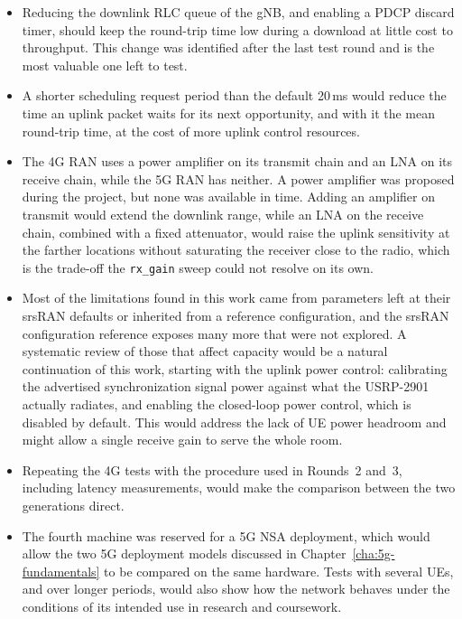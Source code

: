 \begin{itemize}
    \item Reducing the downlink \gls{RLC} queue of the \gls{gNB}, and enabling a \gls{PDCP} discard timer, should keep the round-trip time low during a download at little cost to throughput. This change was identified after the last test round and is the most valuable one left to test.

    \item A shorter scheduling request period than the default 20\,ms would reduce the time an uplink packet waits for its next opportunity, and with it the mean round-trip time, at the cost of more uplink control resources.

    \item The 4G \gls{RAN} uses a power amplifier on its transmit chain and an \gls{LNA} on its receive chain, while the 5G \gls{RAN} has neither. A power amplifier was proposed during the project, but none was available in time. Adding an amplifier on transmit would extend the downlink range, while an \gls{LNA} on the receive chain, combined with a fixed attenuator, would raise the uplink sensitivity at the farther locations without saturating the receiver close to the radio, which is the trade-off the \texttt{rx\_gain} sweep could not resolve on its own.

    \item Most of the limitations found in this work came from parameters left at their srsRAN defaults or inherited from a reference configuration, and the srsRAN configuration reference exposes many more that were not explored. A systematic review of those that affect capacity would be a natural continuation of this work, starting with the uplink power control: calibrating the advertised synchronization signal power against what the USRP-2901 actually radiates, and enabling the closed-loop power control, which is disabled by default. This would address the lack of \gls{UE} power headroom and might allow a single receive gain to serve the whole room.

    \item Repeating the 4G tests with the procedure used in Rounds~2 and~3, including latency measurements, would make the comparison between the two generations direct.

    \item The fourth machine was reserved for a 5G \gls{NSA} deployment, which would allow the two 5G deployment models discussed in Chapter~\ref{cha:5g-fundamentals} to be compared on the same hardware. Tests with several \glspl{UE}, and over longer periods, would also show how the network behaves under the conditions of its intended use in research and coursework.
\end{itemize}

